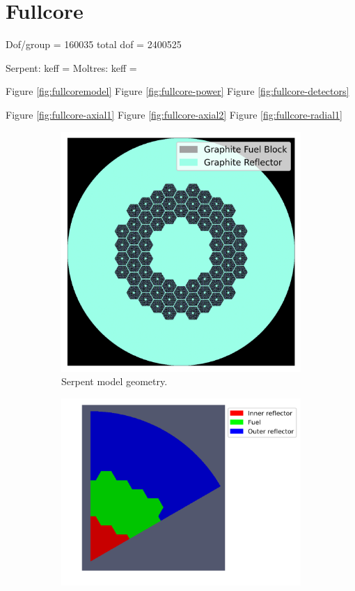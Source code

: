 \documentclass[11pt,letterpaper]{article}
\begin{document}
\section{Fullcore}

Dof/group = 160035
total dof = 2400525

Serpent: keff = 
Moltres: keff = 

Figure \ref{fig:fullcoremodel}
Figure \ref{fig:fullcore-power}
Figure \ref{fig:fullcore-detectors}

Figure \ref{fig:fullcore-axial1}
Figure \ref{fig:fullcore-axial2}
Figure \ref{fig:fullcore-radial1}

\begin{figure}[htbp!]
	\centering
	\begin{subfigure}[t]{0.4\textwidth}
		\centering
		\includegraphics[width=\linewidth]{figures-fullcore/oecd-fullcore}
		\caption{Serpent model geometry.}
	\end{subfigure}
	\begin{subfigure}[t]{0.4\textwidth}
		\centering
		\includegraphics[width=\linewidth]{figures-fullcore/3D-fullcore-60-homo-meshB2}

\end{subfigure}
\end{figure}
\end{document}
